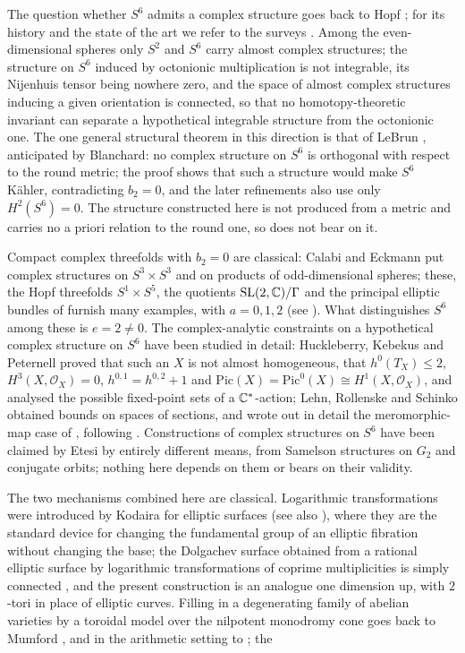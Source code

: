The question whether $S^6$ admits a complex structure goes back to Hopf \cite{Hopf48}; for its history and the state of the art we refer to the surveys \cite{AGr,Ang18}. Among the even-dimensional spheres only $S^2$ and $S^6$ carry almost complex structures; the structure on $S^6$ induced by octonionic multiplication is not integrable, its Nijenhuis tensor being nowhere zero, and the space of almost complex structures inducing a given orientation is connected, so that no homotopy-theoretic invariant can separate a hypothetical integrable structure from the octonionic one. The one general structural theorem in this direction is that of LeBrun \cite{LeB87}, anticipated by Blanchard: no complex structure on $S^6$ is orthogonal with respect to the round metric; the proof shows that such a structure would make $S^6$ K\"ahler, contradicting $b_2 = 0$, and the later refinements also use only $H^2(S^6) = 0$. The structure constructed here is not produced from a metric and carries no a priori relation to the round one, so \cite{LeB87} does not bear on it.

Compact complex threefolds with $b_2 = 0$ are classical: Calabi and Eckmann \cite{CE53} put complex structures on $S^3\times S^3$ and on products of odd-dimensional spheres; these, the Hopf threefolds $S^1\times S^5$, the quotients $\mathrm{SL}(2,\mathbb{C})/\Gamma$ and the principal elliptic bundles of \cite[\S4]{LRS} furnish many examples, with $a = 0,1,2$ (see \cite[\S4]{CDP98}). What distinguishes $S^6$ among these is $e = 2 \ne 0$. The complex-analytic constraints on a hypothetical complex structure on $S^6$ have been studied in detail: Huckleberry, Kebekus and Peternell \cite{HKP} proved that such an $X$ is not almost homogeneous, that $h^0(T_X) \le 2$, $H^3(X,\mathcal O_X) = 0$, $h^{0,1} = h^{0,2}+1$ and $\mathrm{Pic}(X) = \mathrm{Pic}^0(X) \cong H^1(X,\mathcal O_X)$, and analysed the possible fixed-point sets of a $\mathbb{C}^*$-action; Lehn, Rollenske and Schinko \cite{LRS} obtained bounds on spaces of sections, and wrote out in detail the meromorphic-map case of \cite{CDP98,CDP20}, following \cite{CDP98}. Constructions of complex structures on $S^6$ have been claimed by Etesi \cite{Ete15} by entirely different means, from Samelson structures on $G_2$ and conjugate orbits; nothing here depends on them or bears on their validity.

The two mechanisms combined here are classical. Logarithmic transformations were introduced by Kodaira for elliptic surfaces \cite{Kod64} (see also \cite[V.13]{BHPV}), where they are the standard device for changing the fundamental group of an elliptic fibration without changing the base; the Dolgachev surface obtained from a rational elliptic surface by logarithmic transformations of coprime multiplicities is simply connected \cite{Dol81}, and the present construction is an analogue one dimension up, with $2$-tori in place of elliptic curves. Filling in a degenerating family of abelian varieties by a toroidal model over the nilpotent monodromy cone goes back to Mumford \cite{Mum72}, and in the arithmetic setting to \cite{AMRT}; the
\newpage
